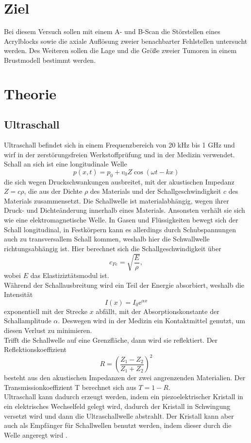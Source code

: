 \section{Ziel}
Bei diesem Versuch sollen mit einem A- und B-Scan die Störstellen eines Acrylblocks sowie die axiale Auflösung zweier benachbarter Fehlstellen untersucht werden. Des Weiteren sollen die Lage und die Größe zweier Tumoren in einem Brustmodell bestimmt werden. 

\section{Theorie}
\label{sec:Theorie}
\subsection{Ultraschall}
Ultraschall befindet sich in einem Frequenzbereich von 20 kHz bis 1 GHz und wirf in der zerstörungsfreien Werkstoffprüfung und in der Medizin verwendet. Schall an sich ist eine longitudinale Welle
\begin{equation*}
  p(x,t)=p_0+v_0 Z \cos(\omega t-kx)
\end{equation*}
die sich wegen Druckschwankungen ausbreitet, mit der akustischen Impedanz $Z=c\rho$, die aus der Dichte $\rho$ des Materials und der Schallgeschwindigkeit $c$ des Materials zusammensetzt. Die Schallwelle ist materialabhängig, wegen ihrer Druck- und Dichteänderung innerhalb eines Materials. Ansonsten verhält sie sich wie eine elektromagnetische Welle. In Gasen und Flüssigkeiten bewegt sich der Schall longitudinal, in Festkörpern kann es allerdings durch Schubspannungen auch zu transversallem Schall kommen, weshalb hier die Schwallwelle richtungsabhängig ist. Hier berechnet sich die Schallgeschwindigkeit über
\begin{equation*}
  c_{Fe}=\sqrt{\frac{E}{\rho}},
\end{equation*}
wobei $E$ das Elastiziztätsmodul ist.\\
Während der Schallausbreitung wird ein Teil der Energie absorbiert, weshalb die Intensität
\begin{equation*}
  I(x)=I_0 \textrm{e}^{\alpha x}
\end{equation*} 
exponentiell mit der Strecke $x$ abfällt, mit der Absorptionskonstante der Schallamplitude $\alpha$. Deswegen wird in der Medizin ein Kontaktmittel genutzt, um diesen Verlust zu minimieren.\\
Trifft die Schallwelle auf eine Grenzfläche, dann wird sie reflektiert. Der Reflektionskoeffizient
\begin{equation*}
  R=\left(\frac{Z_1-Z_2}{Z_1+Z_2}\right)^2
\end{equation*}
besteht aus den akustischen Impedanzen der zwei angrenzenden Materialien. Der Transmissionkoeffizient T berechnet sich aus $T=1-R$.\\
Ultraschall kann dadurch erzeugt werden, indem ein piezoelektrischer Kristall in ein elektrisches Wechselfeld gelegt wird, dadurch der Kristall in Schwingung versetzt wird und dann die Ultraschallwelle abstrahlt. Der Kristall kann aber auch als Empfänger für Schallwellen benutzt werden, indem dieser durch die Welle angeregt wird \cite{1}.

